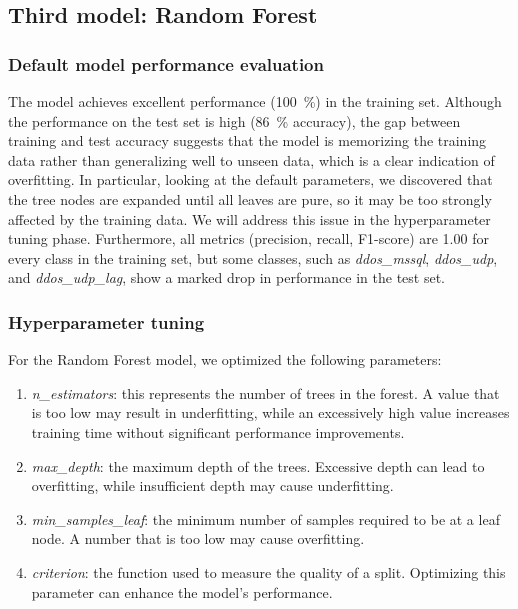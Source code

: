 \documentclass[acmlarge,nonacm]{acmart}
\begin{document}
\subsection{Third model: Random Forest} 
\subsubsection{Default model performance evaluation} 
The model achieves excellent performance (\SI{100}{\percent}) in the training set. Although the performance on the test set is high (\SI{86}{\percent} accuracy), the gap between training and test accuracy suggests that the model is memorizing the training data rather than generalizing well to unseen data, which is a clear indication of overfitting. In particular, looking at the default parameters, we discovered that the tree nodes are expanded until all leaves are pure, so it may be too strongly affected by the training data. We will address this issue in the hyperparameter tuning phase. Furthermore, all metrics (precision, recall, F1-score) are 1.00 for every class in the training set, but some classes, such as \emph{ddos\_mssql}, \emph{ddos\_udp}, and \emph{ddos\_udp\_lag}, show a marked drop in performance in the test set. 

\subsubsection{Hyperparameter tuning} 
For the Random Forest model, we optimized the following parameters:
\begin{enumerate}
    \item \emph{n\_estimators}: this represents the number of trees in the forest. A value that is too low may result in underfitting, while an excessively high value increases training time without significant performance improvements.
    \item \emph{max\_depth}: the maximum depth of the trees. Excessive depth can lead to overfitting, while insufficient depth may cause underfitting.
    \item \emph{min\_samples\_leaf}: the minimum number of samples required to be at a leaf node. A number that is too low may cause overfitting.
    \item \emph{criterion}: the function used to measure the quality of a split. Optimizing this parameter can enhance the model's performance.
\end{enumerate}
\end{document}
